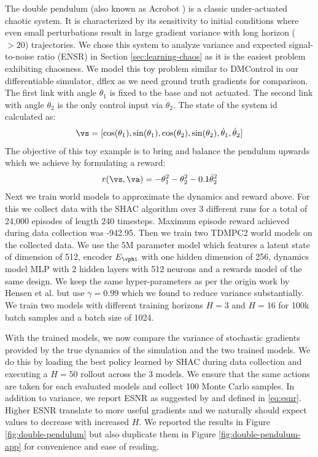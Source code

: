 The double pendulum (also known as Acrobot \citep{murray1991case}) is a classic under-actuated chaotic system. It is characterized by its sensitivity to initial conditions where even small perturbations result in large gradient variance with long horizon ($>20$) trajectories. We chose this system to analyze variance and expected signal-to-noise ratio (ENSR) in Section \ref{sec:learning-chaos} as it is the easiest problem exhibiting chaosness. We model this toy problem similar to DMControl \citep{tunyasuvunakool2020dm_control} in our differentiable simulator, dflex as we need ground truth gradients for comparison. The first link with angle $\theta_1$ is fixed to the base and not actuated. The second link with angle $\theta_2$ is the only control input via $\dot{\theta}_2$. The state of the system id calculated as:
\begin{align*}
    \vs = [\cos(\theta_1), \sin(\theta_1), \cos(\theta_2), \sin(\theta_2), \dot{\theta}_1, \dot{\theta}_2]
\end{align*}
The objective of this toy example is to bring and balance the pendulum upwards which we achieve by formulating a reward:
\begin{align*}
    r(\vs, \va) = -\theta_1^2 -\theta_2^2 - 0.1 \dot{\theta}_2^2 
\end{align*}
Next we train world models to approximate the dynamics and reward above. For this we collect data with the SHAC algorithm \citep{xu2022accelerated} over 3 different runs for a total of 24,000 episodes of length 240 timesteps. Maximum episode reward achieved during data collection was -942.95. Then we train two TDMPC2 \citep{hansen2023td} world models on the collected data. We use the 5M parameter model which features a latent state of dimension of 512, encoder $E_\vphi$ with one hidden dimension of 256, dynamics model MLP with 2 hidden layers with 512 neurons and a rewards model of the same design. We keep the same hyper-parameters as per the origin work by Hensen et al. but use $\gamma = 0.99$ which we found to reduce variance substantially. We train two models with different training horizons $H=3$ and $H=16$ for 100k batch samples and a batch size of 1024.

With the trained models, we now compare the variance of stochastic gradients provided by the true dynamics of the simulation and the two trained models. We do this by loading the best policy learned by SHAC during data collection and executing a $H=50$ rollout across the 3 models. We ensure that the same actions are taken for each evaluated models and collect 100 Monte Carlo samples. In addition to variance, we report ESNR as suggested by \citep{parmas2023model} and defined in \ref{eq:esnr}. Higher ESNR translate to more useful gradients and we naturally should expect values to decrease with increased $H$. We reported the results in Figure \ref{fig:double-pendulum} but also duplicate them in Figure \ref{fig:double-pendulum-app} for convenience and ease of reading.


